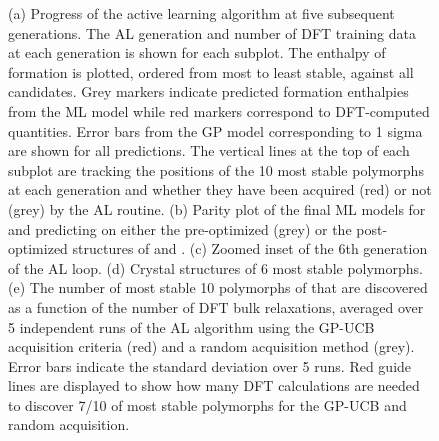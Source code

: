 \begin{figure}[!htb]
\centering
{}
\caption{\label{fig:iro2_al}
(a) Progress of the active learning algorithm at five subsequent generations.
%
The AL generation and number of DFT training data at each generation is shown for each subplot.
%
The enthalpy of formation is plotted, ordered from most to least stable, against all \IrOthree candidates.
%
Grey markers indicate predicted formation enthalpies from the ML model while red markers correspond to DFT-computed quantities.
%
Error bars from the GP model corresponding to 1 sigma are shown for all predictions.
%
The vertical lines at the top of each subplot are tracking the positions of the \num{10} most stable polymorphs at each generation and whether they have been acquired (red) or not (grey) by the AL routine.
(b) Parity plot of the final ML models for \IrOtwo and \IrOthree predicting on either the pre-optimized (grey) or the post-optimized structures of \IrOtwo and \IrOthree.
(c) Zoomed inset of the 6th generation of the AL loop.
(d) Crystal structures of \num{6} most stable \IrOthree polymorphs.
(e) The number of most stable \num{10} polymorphs of \IrOthree that are discovered as a function of the number of DFT bulk relaxations, averaged over \num{5} independent runs of the AL algorithm using the GP-UCB acquisition criteria (red) and a random acquisition method (grey).
%
Error bars indicate the standard deviation over \num{5} runs.
%
Red guide lines are displayed to show how many DFT calculations are needed to discover \num{7/10} of most stable polymorphs for the GP-UCB and random acquisition.
}
\end{figure}
